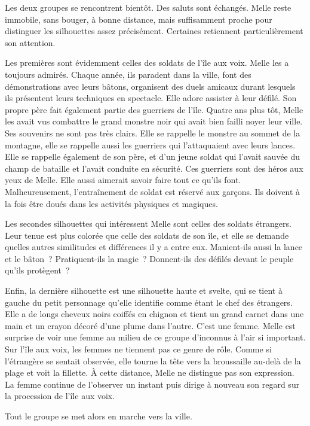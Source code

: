 Les deux groupes se rencontrent bientôt. Des saluts sont échangés. Melle reste immobile, sans bouger, à bonne distance, mais suffisamment proche pour distinguer les silhouettes assez précisément. Certaines retiennent particulièrement son attention.

Les premières sont évidemment celles des soldats de l'île aux voix. Melle les a toujours admirés. Chaque année, ils paradent dans la ville, font des démonstrations avec leurs bâtons, organisent des duels amicaux durant lesquels ils présentent leurs techniques en spectacle. Elle adore assister à leur défilé. Son propre père fait également partie des guerriers de l'île. Quatre ans plus tôt, Melle les avait vus combattre le grand monstre noir qui avait bien failli noyer leur ville. Ses souvenirs ne sont pas très clairs. Elle se rappelle le monstre au sommet de la montagne, elle se rappelle aussi les guerriers qui l'attaquaient avec leurs lances. Elle se rappelle également de son père, et d'un jeune soldat qui l'avait sauvée du champ de bataille et l'avait conduite en sécurité. Ces guerriers sont des héros aux yeux de Melle. Elle aussi aimerait savoir faire tout ce qu'ils font. Malheureusement, l'entraînement de soldat est réservé aux garçons. Ils doivent à la fois être doués dans les activités physiques et magiques.

Les secondes silhouettes qui intéressent Melle sont celles des soldats étrangers. Leur tenue est plus colorée que celle des soldats de son île, et elle se demande quelles autres similitudes et différences il y a entre eux. Manient-ils aussi la lance et le bâton~? Pratiquent-ils la magie~? Donnent-ils des défilés devant le peuple qu'ils protègent~?

Enfin, la dernière silhouette est une silhouette haute et svelte, qui se tient à gauche du petit personnage qu'elle identifie comme étant le chef des étrangers. Elle a de longs cheveux noirs coiffés en chignon et tient un grand carnet dans une main et un crayon décoré d'une plume dans l'autre. C'est une femme. Melle est surprise de voir une femme au milieu de ce groupe d'inconnus à l'air si important. Sur l'île aux voix, les femmes ne tiennent pas ce genre de rôle. Comme si l'étrangère se sentait observée, elle tourne la tête vers la broussaille au-delà de la plage et voit la fillette. À cette distance, Melle ne distingue pas son expression. La femme continue de l'observer un instant puis dirige à nouveau son regard sur la procession de l'île aux voix.

Tout le groupe se met alors en marche vers la ville.

